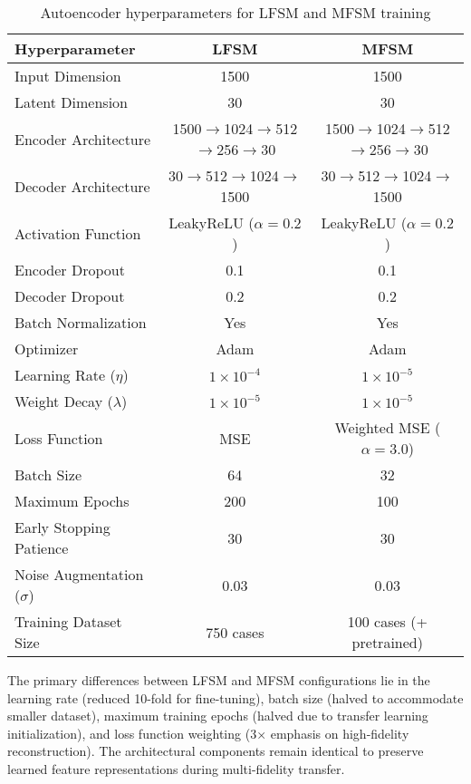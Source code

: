 \documentclass[12pt,a4paper]{report}
\begin{document}
\begin{table}[htbp]
\centering
\caption{Autoencoder hyperparameters for LFSM and MFSM training}
\label{tab:ae_hyperparameters}
\begin{tabular}{lcc}
\hline
\textbf{Hyperparameter} & \textbf{LFSM} & \textbf{MFSM} \\
\hline
Input Dimension & 1500 & 1500 \\
Latent Dimension & 30 & 30 \\
Encoder Architecture & 1500$\rightarrow$1024$\rightarrow$512$\rightarrow$256$\rightarrow$30 & 1500$\rightarrow$1024$\rightarrow$512$\rightarrow$256$\rightarrow$30 \\
Decoder Architecture & 30$\rightarrow$512$\rightarrow$1024$\rightarrow$1500 & 30$\rightarrow$512$\rightarrow$1024$\rightarrow$1500 \\
Activation Function & LeakyReLU ($\alpha=0.2$) & LeakyReLU ($\alpha=0.2$) \\
Encoder Dropout & 0.1 & 0.1 \\
Decoder Dropout & 0.2 & 0.2 \\
Batch Normalization & Yes & Yes \\
Optimizer & Adam & Adam \\
Learning Rate ($\eta$) & $1 \times 10^{-4}$ & $1 \times 10^{-5}$ \\
Weight Decay ($\lambda$) & $1 \times 10^{-5}$ & $1 \times 10^{-5}$ \\
Loss Function & MSE & Weighted MSE ($\alpha=3.0$) \\
Batch Size & 64 & 32 \\
Maximum Epochs & 200 & 100 \\
Early Stopping Patience & 30 & 30 \\
Noise Augmentation ($\sigma$) & 0.03 & 0.03 \\
Training Dataset Size & 750 cases & 100 cases (+ pretrained) \\
\hline
\end{tabular}
\end{table}

The primary differences between LFSM and MFSM configurations lie in the learning rate (reduced 10-fold for fine-tuning), batch size (halved to accommodate smaller dataset), maximum training epochs (halved due to transfer learning initialization), and loss function weighting (3× emphasis on high-fidelity reconstruction). The architectural components remain identical to preserve learned feature representations during multi-fidelity transfer.
\end{document}
